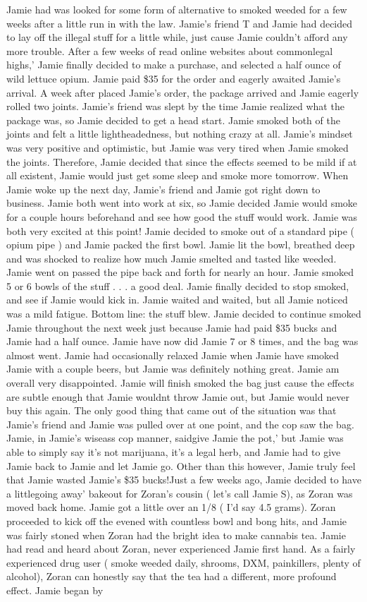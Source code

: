 \documentclass[12pt]{book}
\begin{document}
Jamie had was looked for some form of alternative to smoked weeded for a few weeks after a little run in with the law. Jamie's friend T and Jamie had decided to lay off the illegal stuff for a little while, just cause Jamie couldn't afford any more trouble. After a few weeks of read online websites about commonlegal highs,' Jamie finally decided to make a purchase, and selected a half ounce of wild lettuce opium. Jamie paid \$35 for the order and eagerly awaited Jamie's arrival. A week after placed Jamie's order, the package arrived and Jamie eagerly rolled two joints. Jamie's friend was slept by the time Jamie realized what the package was, so Jamie decided to get a head start. Jamie smoked both of the joints and felt a little lightheadedness, but nothing crazy at all. Jamie's mindset was very positive and optimistic, but Jamie was very tired when Jamie smoked the joints. Therefore, Jamie decided that since the effects seemed to be mild if at all existent, Jamie would just get some sleep and smoke more tomorrow. When Jamie woke up the next day, Jamie's friend and Jamie got right down to business. Jamie both went into work at six, so Jamie decided Jamie would smoke for a couple hours beforehand and see how good the stuff would work. Jamie was both very excited at this point! Jamie decided to smoke out of a standard pipe ( opium pipe ) and Jamie packed the first bowl. Jamie lit the bowl, breathed deep and was shocked to realize how much Jamie smelted and tasted like weeded. Jamie went on passed the pipe back and forth for nearly an hour. Jamie smoked 5 or 6 bowls of the stuff . . .  a good deal. Jamie finally decided to stop smoked, and see if Jamie would kick in. Jamie waited and waited, but all Jamie noticed was a mild fatigue. Bottom line: the stuff blew. Jamie decided to continue smoked Jamie throughout the next week just because Jamie had paid \$35 bucks and Jamie had a half ounce. Jamie have now did Jamie 7 or 8 times, and the bag was almost went. Jamie had occasionally relaxed Jamie when Jamie have smoked Jamie with a couple beers, but Jamie was definitely nothing great. Jamie am overall very disappointed. Jamie will finish smoked the bag just cause the effects are subtle enough that Jamie wouldnt throw Jamie out, but Jamie would never buy this again. The only good thing that came out of the situation was that Jamie's friend and Jamie was pulled over at one point, and the cop saw the bag. Jamie, in Jamie's wiseass cop manner, saidgive Jamie the pot,' but Jamie was able to simply say it's not marijuana, it's a legal herb, and Jamie had to give Jamie back to Jamie and let Jamie go. Other than this however, Jamie truly feel that Jamie wasted Jamie's \$35 bucks!Just a few weeks ago, Jamie decided to have a littlegoing away' bakeout for Zoran's cousin ( let's call Jamie S), as Zoran was moved back home. Jamie got a little over an 1/8 ( I'd say 4.5 grams). Zoran proceeded to kick off the evened with countless bowl and bong hits, and Jamie was fairly stoned when Zoran had the bright idea to make cannabis tea. Jamie had read and heard about Zoran, never experienced Jamie first hand. As a fairly experienced drug user ( smoke weeded daily, shrooms, DXM, painkillers, plenty of alcohol), Zoran can honestly say that the tea had a different, more profound effect. Jamie began by 
\end{document}
